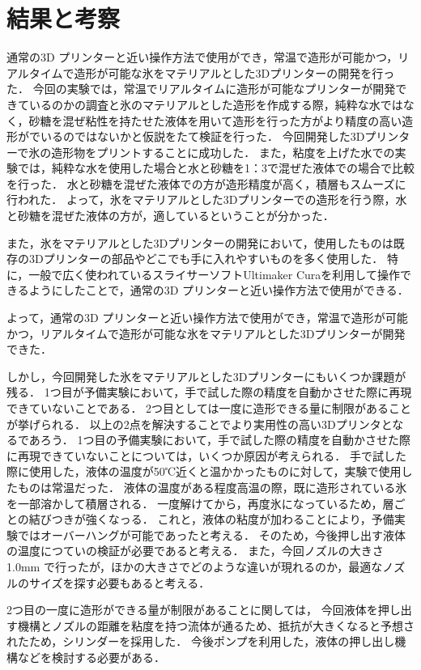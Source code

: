 \chapter{結果と考察}
\label{chp:first}

通常の3D プリンターと近い操作方法で使用ができ，常温で造形が可能かつ，リアルタイムで造形が可能な氷をマテリアルとした3Dプリンターの開発を行った．
今回の実験では，常温でリアルタイムに造形が可能なプリンターが開発できているのかの調査と氷のマテリアルとした造形を作成する際，純粋な水ではなく，砂糖を混ぜ粘性を持たせた液体を用いて造形を行った方がより精度の高い造形がでいるのではないかと仮説をたて検証を行った．
今回開発した3Dプリンターで氷の造形物をプリントすることに成功した．
また，粘度を上げた水での実験では，純粋な水を使用した場合と水と砂糖を1：3で混ぜた液体での場合で比較を行った．
水と砂糖を混ぜた液体での方が造形精度が高く，積層もスムーズに行われた．
よって，氷をマテリアルとした3Dプリンターでの造形を行う際，水と砂糖を混ぜた液体の方が，適しているということが分かった．

また，氷をマテリアルとした3Dプリンターの開発において，使用したものは既存の3Dプリンターの部品やどこでも手に入れやすいものを多く使用した．
特に，一般で広く使われているスライサーソフトUltimaker Curaを利用して操作できるようにしたことで，通常の3D プリンターと近い操作方法で使用ができる．

よって，通常の3D プリンターと近い操作方法で使用ができ，常温で造形が可能かつ，リアルタイムで造形が可能な氷をマテリアルとした3Dプリンターが開発できた．

しかし，今回開発した氷をマテリアルとした3Dプリンターにもいくつか課題が残る．
1つ目が予備実験において，手で試した際の精度を自動かさせた際に再現できていないことである．
2つ目としては一度に造形できる量に制限があることが挙げられる．
以上の2点を解決することでより実用性の高い3Dプリンタとなるであろう．
1つ目の予備実験において，手で試した際の精度を自動かさせた際に再現できていないことについては，いくつか原因が考えられる．
手で試した際に使用した，液体の温度が50℃近くと温かかったものに対して，実験で使用したものは常温だった．
液体の温度がある程度高温の際，既に造形されている氷を一部溶かして積層される．
一度解けてから，再度氷になっているため，層ごとの結びつきが強くなっる．
これと，液体の粘度が加わることにより，予備実験ではオーバーハングが可能であったと考える．
そのため，今後押し出す液体の温度につていの検証が必要であると考える．
また，今回ノズルの大きさ 1.0mm で行ったが，ほかの大きさでどのような違いが現れるのか，最適なノズルのサイズを探す必要もあると考える．

2つ目の一度に造形ができる量が制限があることに関しては，
今回液体を押し出す機構とノズルの距離を粘度を持つ流体が通るため、抵抗が大きくなると予想されたため，シリンダーを採用した．
今後ポンプを利用した，液体の押し出し機構などを検討する必要がある．


